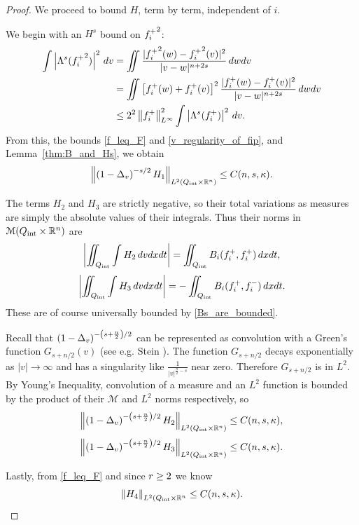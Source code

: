 \begin{proof}
We proceed to bound $H$, term by term, independent of $i$.  

We begin with an $H^s$ bound on ${f_i^+}^2$:
\begin{align}
\int \left\lvert \Lambda^s ({f_i^+}^2) \right\rvert^2 \,dv &= \iint \frac{|{f_i^+}^2(w)-{f_i^+}^2(v)|^2}{|v-w|^{n+2s}}\,dwdv \nonumber
\\ &= \iint \left[ {f_i^+}(w)+{f_i^+}(v) \right]^2 \frac{|{f_i^+}(w)-{f_i^+}(v)|^2}{|v-w|^{n+2s}}\,dwdv \nonumber
\\ &\leq 2^2 \left\lVert{f_i^+}\right\rVert_{L^\infty}^2 \int \left\lvert \Lambda^s ({f_i^+}) \right\rvert^2 \,dv. \label{fip_in_Hs}
\end{align} 
From this, the bounds \eqref{f_leq_F} and \eqref{v_regularity_of_fip}, and Lemma~\ref{thm:B_and_Hs}, we obtain
\begin{equation}\label{bound_on_H1}
\left\lVert\left( 1-\Delta_v \right)^{-s/2} H_1\right\rVert_{L^2({Q_\textrm{int}}\times\mathbb{R}^n)} \leq C(n,s,\kappa). 
\end{equation}

The terms $H_2$ and $H_3$ are strictly negative, so their total variations as measures are simply the absolute values of their integrals.  Thus their norms in $\mathcal{M}({Q_\textrm{int}} \times \mathbb{R}^n)$ are
\[ \left\lvert \iint_{{Q_\textrm{int}}} \int H_2 \,dvdxdt \right\rvert = \iint_{{Q_\textrm{int}}} B_i({f_i^+},{f_i^+}) \,dxdt, \]
\[ \left\lvert \iint_{{Q_\textrm{int}}} \int H_3 \,dvdxdt \right\rvert = -\iint_{{Q_\textrm{int}}} B_i({f_i^+},{f_i^-}) \,dxdt. \]
These are of course universally bounded by \eqref{Bs_are_bounded}.  

Recall that $\left( 1-\Delta_{v} \right)^{-\left( s + \frac{n}{2} \right)/2}$ can be represented as convolution with a Green's function $G_{s+n/2}(v)$ (see e.g. Stein \cite{St.book}).  The function $G_{s+n/2}$ decays exponentially as $|v|\to \infty$ and has a singularity like $\frac{1}{|v|^{\frac{n}{2} - s}}$ near zero.  Therefore $G_{s+n/2}$ is in $L^2$.  By Young's Inequality, convolution of a measure and an $L^2$ function is bounded by the product of their $\mathcal{M}$ and $L^2$ norms respectively, so
\begin{equation}\label{bound_on_H2} 
\left\lVert\left( 1-\Delta_v \right)^{-\left( s + \frac{n}{2} \right)/2}H_2\right\rVert_{L^2({Q_\textrm{int}} \times \mathbb{R}^n)} \leq C(n,s,\kappa), 
\end{equation}
\begin{equation}\label{bound_on_H3}
\left\lVert\left( 1-\Delta_v \right)^{-\left( s + \frac{n}{2} \right)/2}H_3\right\rVert_{L^2({Q_\textrm{int}} \times \mathbb{R}^n)} \leq C(n,s,\kappa). 
\end{equation}

Lastly, from \eqref{f_leq_F} and since ${r} \geq 2$ we know
\begin{equation}\label{bound_on_H4}
\left\lVert H_4\right\rVert_{L^2({Q_\textrm{int}} \times \mathbb{R}^n} \leq C(n,s,\kappa). 
\end{equation}


\end{proof}
